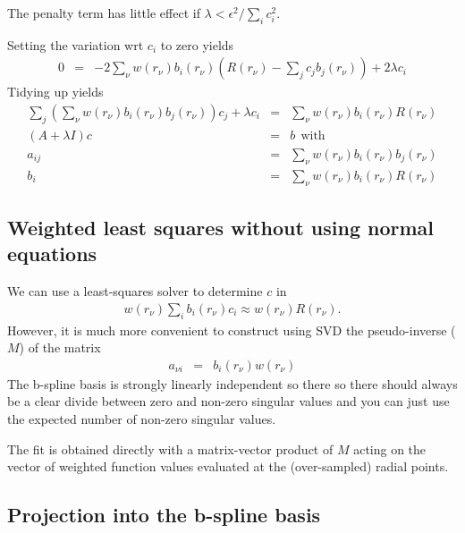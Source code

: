 \documentclass[12pt]{article}
\begin{document}
The penalty term has little effect if $\lambda < \epsilon^2 / \sum_i c_i^2$. 

Setting the variation wrt $c_i$ to zero yields
\begin{eqnarray}
  0 & = & - 2 \sum_\nu  w(r_\nu) b_i(r_\nu) \left( R(r_\nu) - \sum_j c_j b_j(r_\nu) \right) + 2\lambda c_i
\end{eqnarray}
Tidying up yields
\begin{eqnarray}
  \sum_j \left( \sum_\nu w(r_\nu) b_i(r_\nu) b_j(r_\nu) \right) c_j + \lambda c_i & = & \sum_\nu  w(r_\nu) b_i(r_\nu)  R(r_\nu) \\
  \left( A + \lambda I \right) c & = & b ~ ~\mbox{with} \\
  a_{ij} & = & \sum_\nu w(r_\nu) b_i(r_\nu) b_j(r_\nu) \\
  b_i & = & \sum_\nu  w(r_\nu)  b_i(r_\nu) R(r_\nu) 
\end{eqnarray}

\subsection{Weighted least squares without using normal equations}

We can use a least-squares solver to determine $c$ in
\begin{eqnarray}
  w(r_\nu) \sum_i b_i(r_\nu) c_i \approx w(r_\nu) R(r_\nu).
\end{eqnarray}
However, it is much more convenient to construct using SVD the pseudo-inverse ($M$) of the matrix
\begin{eqnarray}
 a_{\nu i} & = & b_i(r_\nu) w(r_\nu) 
\end{eqnarray}
The b-spline basis is strongly linearly independent so there so there should always be a clear divide between zero and non-zero singular values and you can just use the expected number of non-zero singular values.

The fit is obtained directly with a matrix-vector product of $M$ acting on the vector of weighted function values evaluated at the (over-sampled) radial points.

\subsection{Projection into the b-spline basis}
\end{document}
